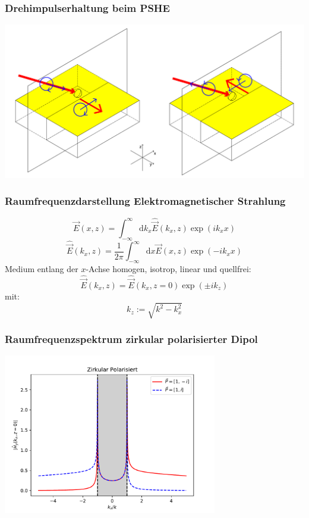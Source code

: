 \documentclass[aspectratio=1610]{beamer}
\begin{document}
		\begin{frame}
			\frametitle{Drehimpulserhaltung beim PSHE}
				\includegraphics[width=1.0\linewidth]{figures/spin_hall_schema.pdf}
		\end{frame}
	
		\begin{frame}
			\frametitle{Raumfrequenzdarstellung Elektromagnetischer Strahlung}
			\begin{equation}
				\vec{E}(x,z) = 	\int_{-\infty}^{\infty}\mathrm{d}{k_x}\hat{\vec{E}}(k_x,z)\exp(ik_xx)			
			\end{equation}
			\begin{equation}
				\hat{\vec{E}}(k_x,z) = 	\dfrac{1}{2\pi}\int_{-\infty}^{\infty}\mathrm{d}x\vec{E}(x,z)\exp(-ik_xx)
			\end{equation}
				Medium entlang der $x$-Achse homogen, isotrop, linear und quellfrei:
		 	\begin{equation}
			 	\hat{\vec{E}}(k_x,z) =\hat{\vec{E}}(k_x,z= 0) \exp(\pm ik_ z)
			 \end{equation}
		 		mit:
		 	\begin{equation}
		 		k_z := \sqrt{k^2-k_x^2}
		 	\end{equation}		
		\end{frame}
	
		\begin{frame}
			\frametitle{Raumfrequenzspektrum zirkular polarisierter Dipol}
			\begin{center}
				\includegraphics[width=0.7\textwidth]{figures/spatial_spectrum_circ.pdf}	
			\end{center}				
		\end{frame}
\end{document}

